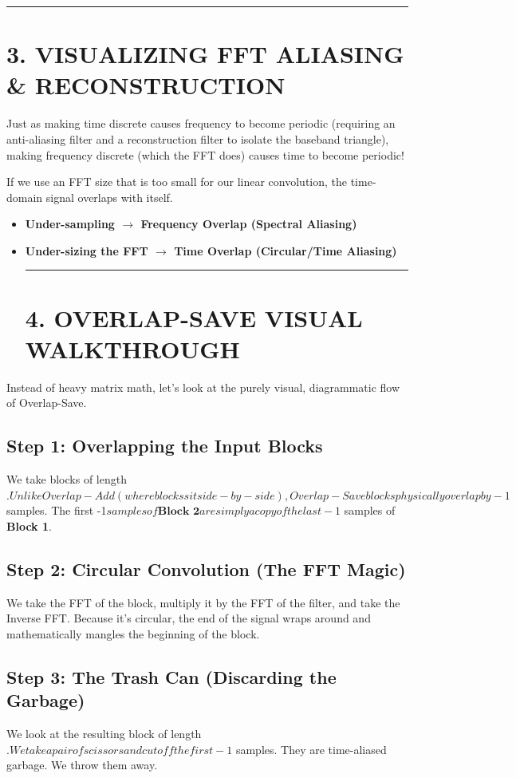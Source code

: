 \documentclass[11pt,a4paper]{article}
\begin{document}
\noindent\rule{\textwidth}{0.5pt}
\section*{3. VISUALIZING FFT ALIASING \& RECONSTRUCTION}

Just as making time discrete causes frequency to become periodic (requiring an anti-aliasing filter and a reconstruction filter to isolate the baseband triangle), making frequency discrete (which the FFT does) causes time to become periodic!

If we use an FFT size that is too small for our linear convolution, the time-domain signal overlaps with itself.
\begin{itemize}
\item \textbf{Under-sampling $\rightarrow$ Frequency Overlap (Spectral Aliasing)}
\item \textbf{Under-sizing the FFT $\rightarrow$ Time Overlap (Circular/Time Aliasing)}

\noindent\rule{\textwidth}{0.5pt}
\section*{4. OVERLAP-SAVE VISUAL WALKTHROUGH}

\end{itemize}
Instead of heavy matrix math, let's look at the purely visual, diagrammatic flow of Overlap-Save.

\subsection*{Step 1: Overlapping the Input Blocks}
We take blocks of length $. Unlike Overlap-Add (where blocks sit side-by-side), Overlap-Save blocks physically overlap by -1$ samples. 
The first -1$ samples of \textbf{Block 2} are simply a copy of the last -1$ samples of \textbf{Block 1}.

\subsection*{Step 2: Circular Convolution (The FFT Magic)}
We take the FFT of the block, multiply it by the FFT of the filter, and take the Inverse FFT. 
Because it's circular, the end of the signal wraps around and mathematically mangles the beginning of the block.

\subsection*{Step 3: The Trash Can (Discarding the Garbage)}
We look at the resulting block of length $. We take a pair of scissors and cut off the first -1$ samples. They are time-aliased garbage. We throw them away.
\end{document}
